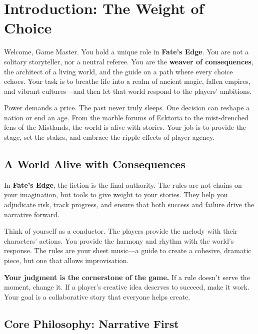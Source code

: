 \chapter{Introduction: The Weight of Choice}
\label{ch:gm-intro}

Welcome, Game Master. You hold a unique role in \textbf{Fate's Edge}. You are not a solitary storyteller, nor a neutral referee. You are the \textbf{weaver of consequences}, the architect of a living world, and the guide on a path where every choice echoes. Your task is to breathe life into a realm of ancient magic, fallen empires, and vibrant cultures---and then let that world respond to the players' ambitions.

Power demands a price. The past never truly sleeps. One decision can reshape a nation or end an age. From the marble forums of Ecktoria to the mist-drenched fens of the Mistlands, the world is alive with stories. Your job is to provide the stage, set the stakes, and embrace the ripple effects of player agency.

\section{A World Alive with Consequences}
\label{sec:gm-consequences}

In \textbf{Fate's Edge}, the fiction is the final authority. The rules are not chains on your imagination, but tools to give weight to your stories. They help you adjudicate risk, track progress, and ensure that both success and failure drive the narrative forward.

Think of yourself as a conductor. The players provide the melody with their characters' actions. You provide the harmony and rhythm with the world's response. The rules are your sheet music---a guide to create a cohesive, dramatic piece, but one that allows improvisation.

\vspace{2mm}
\noindent \textbf{Your judgment is the cornerstone of the game.} If a rule doesn't serve the moment, change it. If a player's creative idea deserves to succeed, make it work. Your goal is a collaborative story that everyone helps create.

\section{Core Philosophy: Narrative First}
\label{sec:gm-narrative-first}

